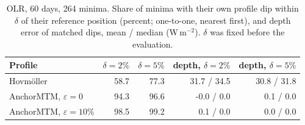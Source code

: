 \begin{table}[H]
\centering\small\setlength{\tabcolsep}{3.2pt}
\caption{OLR, 60 days, 264 minima. Share of minima with their own profile dip within $\delta$ of their reference position (percent; one-to-one, nearest first), and depth error of matched dips, mean / median (W\,m$^{-2}$). $\delta$ was fixed before the evaluation.}\label{tab:supp_olr_resolution}
\begin{tabular}{lrrrr}\toprule
Profile & $\delta{=}2\%$ & $\delta{=}5\%$ & depth, $\delta{=}2\%$ & depth, $\delta{=}5\%$\\\midrule
Hovm\"oller & 58.7 & 77.3 & 31.7 / 34.5 & 30.8 / 31.8\\
AnchorMTM, $\varepsilon=0$ & 94.3 & 96.6 & -0.0 / 0.0 & 0.1 / 0.0\\
AnchorMTM, $\varepsilon=10\%$ & 98.5 & 99.2 & 0.1 / 0.0 & 0.0 / 0.0\\
\bottomrule\end{tabular}
\end{table}
